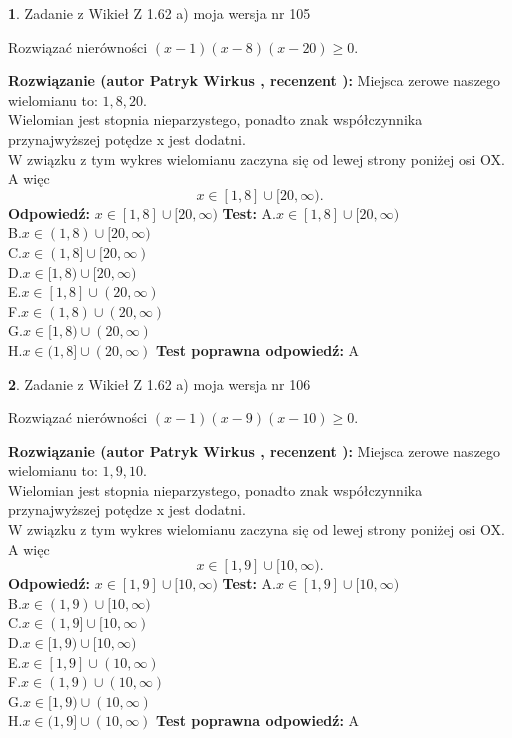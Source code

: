 \documentclass[12pt, a4paper]{article}
\theoremstyle{definition} %
\newtheorem{zad}{}
\newcommand{\zadStart}[1]{\begin{zad}#1\newline}
\newcommand{\zadStop}{\end{zad}}
\newcommand{\rozwStart}[2]{\noindent \textbf{Rozwiązanie (autor #1 , recenzent #2): }\newline}
\newcommand{\rozwStop}{\newline}
\newcommand{\odpStart}{\noindent \textbf{Odpowiedź:}\newline}
\newcommand{\odpStop}{\newline}
\newcommand{\testStart}{\noindent \textbf{Test:}\newline}
\newcommand{\testStop}{\newline}
\newcommand{\kluczStart}{\noindent \textbf{Test poprawna odpowiedź:}\newline}
\newcommand{\kluczStop}{\newline}
\begin{document}
\zadStart{Zadanie z Wikieł Z 1.62 a) moja wersja nr 105}

Rozwiązać nierówności $(x-1)(x-8)(x-20)\ge0$.
\zadStop
\rozwStart{Patryk Wirkus}{}
Miejsca zerowe naszego wielomianu to: $1, 8, 20$.\\
Wielomian jest stopnia nieparzystego, ponadto znak współczynnika przy\linebreak najwyższej potędze x jest dodatni.\\ W związku z tym wykres wielomianu zaczyna się od lewej strony poniżej osi OX. A więc $$x \in [1,8] \cup [20,\infty).$$
\rozwStop
\odpStart
$x \in [1,8] \cup [20,\infty)$
\odpStop
\testStart
A.$x \in [1,8] \cup [20,\infty)$\\
B.$x \in (1,8) \cup [20,\infty)$\\
C.$x \in (1,8] \cup [20,\infty)$\\
D.$x \in [1,8) \cup [20,\infty)$\\
E.$x \in [1,8] \cup (20,\infty)$\\
F.$x \in (1,8) \cup (20,\infty)$\\
G.$x \in [1,8) \cup (20,\infty)$\\
H.$x \in (1,8] \cup (20,\infty)$
\testStop
\kluczStart
A
\kluczStop



\zadStart{Zadanie z Wikieł Z 1.62 a) moja wersja nr 106}

Rozwiązać nierówności $(x-1)(x-9)(x-10)\ge0$.
\zadStop
\rozwStart{Patryk Wirkus}{}
Miejsca zerowe naszego wielomianu to: $1, 9, 10$.\\
Wielomian jest stopnia nieparzystego, ponadto znak współczynnika przy\linebreak najwyższej potędze x jest dodatni.\\ W związku z tym wykres wielomianu zaczyna się od lewej strony poniżej osi OX. A więc $$x \in [1,9] \cup [10,\infty).$$
\rozwStop
\odpStart
$x \in [1,9] \cup [10,\infty)$
\odpStop
\testStart
A.$x \in [1,9] \cup [10,\infty)$\\
B.$x \in (1,9) \cup [10,\infty)$\\
C.$x \in (1,9] \cup [10,\infty)$\\
D.$x \in [1,9) \cup [10,\infty)$\\
E.$x \in [1,9] \cup (10,\infty)$\\
F.$x \in (1,9) \cup (10,\infty)$\\
G.$x \in [1,9) \cup (10,\infty)$\\
H.$x \in (1,9] \cup (10,\infty)$
\testStop
\kluczStart
A
\kluczStop
\end{document}

